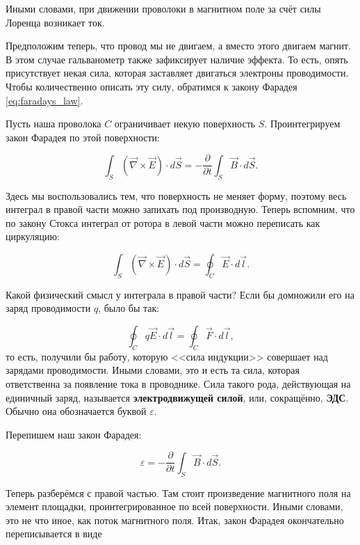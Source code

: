 \documentclass[a4paper,12pt]{article}
\numberwithin{equation}{section}
\newcommand{\pt}{\partial}
\newcommand{\vareps}{\varepsilon}
\newcommand{\vn}{\vec{\nabla}}
\begin{document}
Иными словами, при движении проволоки в магнитном поле за счёт силы
Лоренца возникает ток. 

Предположим теперь, что провод мы не двигаем, а вместо этого двигаем
магнит. В этом случае гальванометр также зафиксирует наличие
эффекта. То есть, опять присутствует некая сила, которая заставляет
двигаться электроны проводимости. Чтобы количественно описать эту
силу, обратимся к закону Фарадея \eqref{eq:faradays_law}. 

Пусть наша проволока $C$ ограничивает некую поверхность
$S$. Проинтегрируем закон Фарадея по этой поверхности: 

\begin{equation}
  \label{eq:eds_1}
  \int_S \left( \vn \times \vec{E} \right) \cdot d\vec{S} = -
  \frac{\pt}{\pt t} \int_S \vec{B} \cdot d\vec{S}.
\end{equation}

Здесь мы воспользовались тем, что поверхность не меняет форму, поэтому
весь интеграл в правой части можно запихать под производную. Теперь
вспомним, что по закону Стокса интеграл от ротора в левой части можно
переписать как циркуляцию: 

\begin{equation}
  \label{eq:eds_2}
  \int_S \left( \vn \times \vec{E} \right) \cdot d\vec{S} = \oint_C
  \vec{E} \cdot d \vec{l}.
\end{equation}

Какой физический смысл у интеграла в правой части? Если бы домножили
его на заряд проводимости $q$, было бы так: 

\begin{equation}
  \label{eq:eds_3}
  \oint_C q \vec{E} \cdot d \vec{l} = \oint_C \vec{F} \cdot d \vec{l},
\end{equation}
то есть, получили бы работу, которую <<сила индукции>> совершает над
зарядами проводимости. Иными словами, это и есть та сила, которая
ответственна за появление тока в проводнике. Сила такого рода,
действующая на единичный заряд, называется \textbf{электродвижущей
  силой}, или, сокращённо, \textbf{ЭДС}. Обычно она обозначается
буквой $\vareps$. 

Перепишем наш закон Фарадея:

\begin{equation}
  \label{eq:eds_4}
  \vareps = - \frac{\pt}{\pt t} \int_S \vec{B} \cdot d\vec{S}.
\end{equation}

Теперь разберёмся с правой частью. Там стоит произведение магнитного
поля на элемент площадки, проинтегрированное по всей
поверхности. Иными словами, это не что иное, как поток магнитного
поля. Итак, закон Фарадея окончательно переписывается в виде
\end{document}
